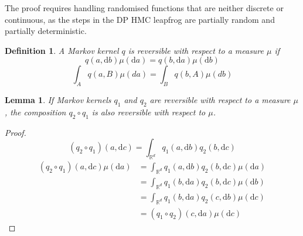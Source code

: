 \documentclass[english,twoside,openright]{HYgraduMLDS}
\newtheorem{lemma}{Lemma}
\newtheorem{definition}{Definition}
\newcommand{\R}{\mathbb{R}}
\newcommand{\dx}{\mathrm{d}}
\begin{document}
The proof requires handling randomised functions that are neither discrete or
continuous, as the steps in the DP HMC leapfrog are partially random and
partially deterministic.

\begin{definition}
	A Markov kernel \(q\) is reversible with respect to a measure \(\mu\)
  if
  \[
    q(a, \dx b)\mu(\dx a) = q(b, \dx a)\mu(\dx b)
  \]
  \[
    \int_{A}q(a, B)\mu(da) = \int_{B}q(b, A)\mu(db)
  \]
\end{definition}

\begin{lemma}\label{composition_reversible_lemma}
	If Markov kernels \(q_{1}\) and \(q_{2}\) are reversible with respect to a
  measure \(\mu\), the composition \(q_{2}\circ q_{1}\) is also reversible
  with respect to \(\mu\).
\end{lemma}
\begin{proof}
  \[
    (q_{2}\circ q_{1})(a, \dx c) = \int_{\R^{d}}q_{1}(a, \dx b)q_{2}(b, \dx c)
  \]
	\begin{align*}
    (q_{2}\circ q_{1})(a, \dx c)\mu(\dx a)
    &= \int_{\R^{d}}q_{1}(a, \dx b)q_{2}(b, \dx c)\mu(\dx a)
    \\&= \int_{\R^{d}}q_{1}(b, \dx a)q_{2}(b, \dx c)\mu(\dx b)
    \\&= \int_{\R^{d}}q_{1}(b, \dx a)q_{2}(c, \dx b)\mu(\dx c)
    \\&= (q_{1}\circ q_{2})(c, \dx a)\mu(\dx c)
  \end{align*}
\end{proof}
\end{document}
